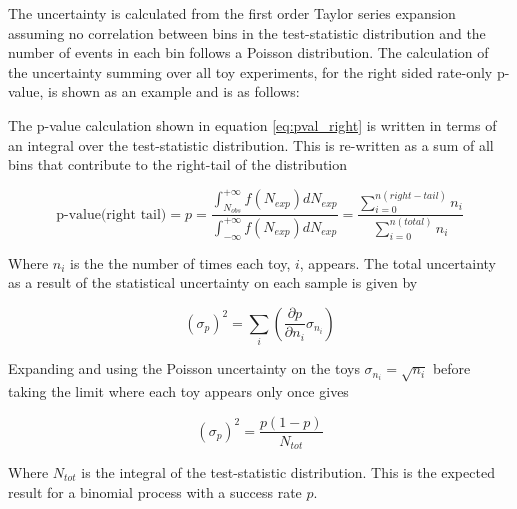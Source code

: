The uncertainty is calculated from the first order Taylor series expansion assuming no correlation between bins in the test-statistic distribution and the number of events in each bin follows a Poisson distribution. The calculation of the uncertainty summing over all toy experiments, for the right sided rate-only p-value, is shown as an example and is as follows:

The p-value calculation shown in equation \ref{eq:pval_right} is written in terms of an integral over the test-statistic distribution. This is re-written as a sum of all bins that contribute to the right-tail of the distribution

\begin{equation} \label{eq:pval_pn_pd}
\textrm{p-value} \textrm{(right tail)} = p =
\frac{\int_{N_{obs}}^{+\infty} f \left( N_{exp} \right) dN_{exp}}{ \int_{-\infty}^{+\infty} f \left( N_{exp} \right) dN_{exp}} =
\frac{\sum_{i=0}^{n(right-tail)} n_{i}}{\sum_{i=0}^{n(total)} n_{i}}
\end{equation}

Where $n_{i}$ is the the number of times each toy, $i$, appears. The total uncertainty as a result of the statistical uncertainty on each sample is given by

\begin{equation} 
\left( \sigma_p \right)^2 = 
\sum_{i} \left( \frac{\partial p}{\partial n_i} \sigma_{n_i} \right)
\end{equation}

Expanding and using the Poisson uncertainty on the toys $\sigma_{n_i} = \sqrt{n_i}$ before taking the limit where each toy appears only once gives

\begin{equation} \label{eq:pval_error}
\left( \sigma_p \right)^2 = 
\frac{p(1-p)}{N_{tot}}
\end{equation}

Where $N_{tot}$ is the integral of the test-statistic distribution. This is the expected result for a binomial process with a success rate $p$.





